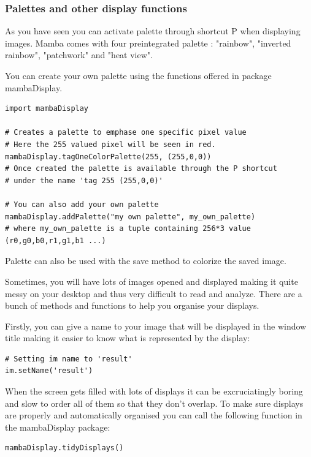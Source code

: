 \documentclass[a4paper,10pt,oneside]{article}
\begin{document}
\subsubsection{Palettes and other display functions}

As you have seen you can activate palette through shortcut P when displaying
images. Mamba comes with four preintegrated palette : "rainbow", "inverted rainbow",
"patchwork" and "heat view".

You can create your own palette using the functions offered in package
mambaDisplay.

\lstset{language=Python}
\begin{lstlisting}
import mambaDisplay

# Creates a palette to emphase one specific pixel value
# Here the 255 valued pixel will be seen in red.
mambaDisplay.tagOneColorPalette(255, (255,0,0))
# Once created the palette is available through the P shortcut
# under the name 'tag 255 (255,0,0)'

# You can also add your own palette
mambaDisplay.addPalette("my own palette", my_own_palette)
# where my_own_palette is a tuple containing 256*3 value (r0,g0,b0,r1,g1,b1 ...)
\end{lstlisting}

Palette can also be used with the save method to colorize the saved image.

Sometimes, you will have lots of images opened and displayed making it quite
messy on your desktop and thus very difficult to read and analyze. There are a
bunch of methods and functions to help you organise your displays.

Firstly, you can give a name to your image that will be displayed in the window
title making it easier to know what is represented by the display:

\lstset{language=Python}
\begin{lstlisting}
# Setting im name to 'result'
im.setName('result')
\end{lstlisting}

When the screen gets filled with lots of displays it can be excruciatingly
boring and slow to order all of them so that they don't overlap. To make sure 
displays are properly and automatically organised you can call the following 
function in the mambaDisplay package:

\lstset{language=Python}
\begin{lstlisting}
mambaDisplay.tidyDisplays()
\end{lstlisting}
\end{document}
